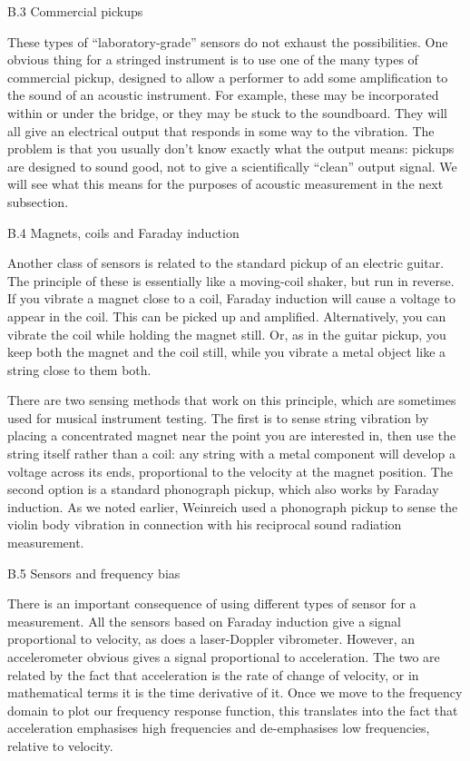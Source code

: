   B.3 Commercial pickups 

  These types of “laboratory-grade” sensors do not exhaust the possibilities. 
  One obvious thing for a stringed instrument is to use one of the many types 
  of commercial pickup, designed to allow a performer to add some amplification 
  to the sound of an acoustic instrument. For example, these may be 
  incorporated within or under the bridge, or they may be stuck to the 
  soundboard. They will all give an electrical output that responds in some way 
  to the vibration. The problem is that you usually don’t know exactly what the 
  output means: pickups are designed to sound good, not to give a 
  scientifically “clean” output signal. We will see what this means for the 
  purposes of acoustic measurement in the next subsection. 

  B.4 Magnets, coils and Faraday induction 

  Another class of sensors is related to the standard pickup of an electric 
  guitar. The principle of these is essentially like a moving-coil shaker, but 
  run in reverse. If you vibrate a magnet close to a coil, Faraday induction 
  will cause a voltage to appear in the coil. This can be picked up and 
  amplified. Alternatively, you can vibrate the coil while holding the magnet 
  still. Or, as in the guitar pickup, you keep both the magnet and the coil 
  still, while you vibrate a metal object like a string close to them both. 

  There are two sensing methods that work on this principle, which are 
  sometimes used for musical instrument testing. The first is to sense string 
  vibration by placing a concentrated magnet near the point you are interested 
  in, then use the string itself rather than a coil: any string with a metal 
  component will develop a voltage across its ends, proportional to the 
  velocity at the magnet position. The second option is a standard phonograph 
  pickup, which also works by Faraday induction. As we noted earlier, Weinreich 
  used a phonograph pickup to sense the violin body vibration in connection 
  with his reciprocal sound radiation measurement. 

  B.5 Sensors and frequency bias 

  There is an important consequence of using different types of sensor for a 
  measurement. All the sensors based on Faraday induction give a signal 
  proportional to velocity, as does a laser-Doppler vibrometer. However, an 
  accelerometer obvious gives a signal proportional to acceleration. The two 
  are related by the fact that acceleration is the rate of change of velocity, 
  or in mathematical terms it is the time derivative of it. Once we move to the 
  frequency domain to plot our frequency response function, this translates 
  into the fact that acceleration emphasises high frequencies and de-emphasises 
  low frequencies, relative to velocity. 

